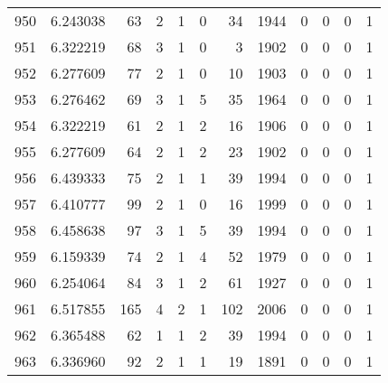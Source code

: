 \begin{tabular}{lrrrrrrrrrrr}
950 &  6.243038 &   63 &      2 &        1 &      0 &              34 &  1944 &               0 &               0 &               0 &               1 \\
951 &  6.322219 &   68 &      3 &        1 &      0 &               3 &  1902 &               0 &               0 &               0 &               1 \\
952 &  6.277609 &   77 &      2 &        1 &      0 &              10 &  1903 &               0 &               0 &               0 &               1 \\
953 &  6.276462 &   69 &      3 &        1 &      5 &              35 &  1964 &               0 &               0 &               0 &               1 \\
954 &  6.322219 &   61 &      2 &        1 &      2 &              16 &  1906 &               0 &               0 &               0 &               1 \\
955 &  6.277609 &   64 &      2 &        1 &      2 &              23 &  1902 &               0 &               0 &               0 &               1 \\
956 &  6.439333 &   75 &      2 &        1 &      1 &              39 &  1994 &               0 &               0 &               0 &               1 \\
957 &  6.410777 &   99 &      2 &        1 &      0 &              16 &  1999 &               0 &               0 &               0 &               1 \\
958 &  6.458638 &   97 &      3 &        1 &      5 &              39 &  1994 &               0 &               0 &               0 &               1 \\
959 &  6.159339 &   74 &      2 &        1 &      4 &              52 &  1979 &               0 &               0 &               0 &               1 \\
960 &  6.254064 &   84 &      3 &        1 &      2 &              61 &  1927 &               0 &               0 &               0 &               1 \\
961 &  6.517855 &  165 &      4 &        2 &      1 &             102 &  2006 &               0 &               0 &               0 &               1 \\
962 &  6.365488 &   62 &      1 &        1 &      2 &              39 &  1994 &               0 &               0 &               0 &               1 \\
963 &  6.336960 &   92 &      2 &        1 &      1 &              19 &  1891 &               0 &               0 &               0 &               1 \\

\end{tabular}
